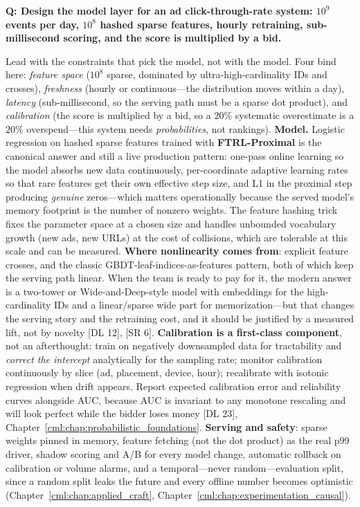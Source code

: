 \begin{interviewq}
\textbf{Q: Design the model layer for an ad click-through-rate system: $10^9$ events per day, $10^8$ hashed sparse features, hourly retraining, sub-millisecond scoring, and the score is multiplied by a bid.}

 \quad {} \quad \badgefreq{\freqlow}

\stronganswer

Lead with the constraints that pick the model, not with the model. Four bind here: \emph{feature space} ($10^8$ sparse, dominated by ultra-high-cardinality IDs and crosses), \emph{freshness} (hourly or continuous---the distribution moves within a day), \emph{latency} (sub-millisecond, so the serving path must be a sparse dot product), and \emph{calibration} (the score is multiplied by a bid, so a $20\%$ systematic overestimate is a $20\%$ overspend---this system needs \emph{probabilities}, not rankings). \textbf{Model.} Logistic regression on hashed sparse features trained with \textbf{FTRL-Proximal} is the canonical answer and still a live production pattern: one-pass online learning so the model absorbs new data continuously, per-coordinate adaptive learning rates so that rare features get their own effective step size, and L1 in the proximal step producing \emph{genuine} zeros---which matters operationally because the served model's memory footprint is the number of nonzero weights. The feature hashing trick fixes the parameter space at a chosen size and handles unbounded vocabulary growth (new ads, new URLs) at the cost of collisions, which are tolerable at this scale and can be measured. \textbf{Where nonlinearity comes from}: explicit feature crosses, and the classic GBDT-leaf-indices-as-features pattern, both of which keep the serving path linear. When the team is ready to pay for it, the modern answer is a two-tower or Wide-and-Deep-style model with embeddings for the high-cardinality IDs and a linear/sparse wide part for memorization---but that changes the serving story and the retraining cost, and it should be justified by a measured lift, not by novelty [DL 12], [SR 6]. \textbf{Calibration is a first-class component}, not an afterthought: train on negatively downsampled data for tractability and \emph{correct the intercept} analytically for the sampling rate; monitor calibration continuously by slice (ad, placement, device, hour); recalibrate with isotonic regression when drift appears. Report expected calibration error and reliability curves alongside AUC, because AUC is invariant to any monotone rescaling and will look perfect while the bidder loses money [DL 23], Chapter~\ref{cml:chap:probabilistic_foundations}. \textbf{Serving and safety}: sparse weights pinned in memory, feature fetching (not the dot product) as the real p99 driver, shadow scoring and A/B for every model change, automatic rollback on calibration or volume alarms, and a temporal---never random---evaluation split, since a random split leaks the future and every offline number becomes optimistic (Chapter~\ref{cml:chap:applied_craft}, Chapter~\ref{cml:chap:experimentation_causal}).


\end{interviewq}
